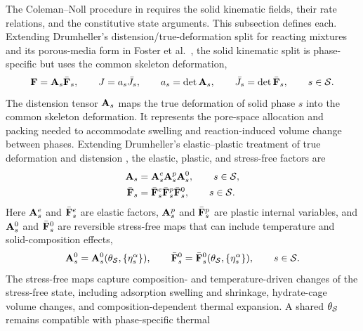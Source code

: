 The Coleman--Noll procedure in  requires the
solid kinematic fields, their rate relations, and the constitutive state
arguments.  This subsection defines each.  Extending Drumheller's
distension/true-deformation split for reacting mixtures
\cite{drumheller2000} and its porous-media form in Foster et
al.~\cite{foster2026reactingporous}, the solid kinematic split is
phase-specific but uses the common skeleton deformation,
%
\begin{equation}
	\mathbf{F}=\mathbf{A}_s\bar{\mathbf{F}}_s,
	\qquad
	J=a_s\bar J_s,
	\qquad
	a_s=\det\mathbf{A}_s,
	\qquad
	\bar J_s=\det\bar{\mathbf{F}}_s,
	\qquad
	s\in\mathcal{S} .
	\label{eq:MC_solid_distension_decomposition}
\end{equation}
%
The distension tensor \(\mathbf{A}_s\) maps the true deformation of solid phase
\(s\) into the common skeleton deformation.  It represents the pore-space
allocation and packing needed to accommodate swelling and reaction-induced
volume change between phases.  Extending
Drumheller's elastic--plastic treatment of true deformation and distension
\cite{drumheller2000}, the elastic, plastic, and stress-free factors are
%
\begin{subequations}
	\label{eq:MC_solid_kinematic_splits}
	\begin{align}
		\mathbf{A}_s
		 & =
		\mathbf{A}_s^e\mathbf{A}_s^p\mathbf{A}_s^0,
		\qquad
		s\in\mathcal{S},
		\label{eq:MC_solid_distension_split} \\
		\bar{\mathbf{F}}_s
		 & =
		\bar{\mathbf{F}}_s^e
		\bar{\mathbf{F}}_s^p
		\bar{\mathbf{F}}_s^0,
		\qquad
		s\in\mathcal{S} .
		\label{eq:MC_solid_true_split}
	\end{align}
\end{subequations}
%
Here \(\mathbf{A}_s^e\) and \(\bar{\mathbf{F}}_s^e\) are elastic factors,
\(\mathbf{A}_s^p\) and \(\bar{\mathbf{F}}_s^p\) are plastic internal variables, and
\(\mathbf{A}_s^0\) and \(\bar{\mathbf{F}}_s^0\) are reversible stress-free maps that can
include temperature and solid-composition effects,
%
\begin{equation}
	\mathbf{A}_s^0
	=
	\mathbf{A}_s^0(\theta_{\mathcal{S}},\{\eta_s^\alpha\}),
	\qquad
	\bar{\mathbf{F}}_s^0
	=
	\bar{\mathbf{F}}_s^0(\theta_{\mathcal{S}},\{\eta_s^\alpha\}),
	\qquad
	s\in\mathcal{S} .
	\label{eq:MC_solid_stress_free_maps}
\end{equation}
%
The stress-free maps capture composition- and temperature-driven changes of
the stress-free state, including adsorption swelling and shrinkage,
hydrate-cage volume changes, and composition-dependent thermal expansion.
A shared \(\theta_{\mathcal{S}}\) remains compatible with phase-specific thermal
